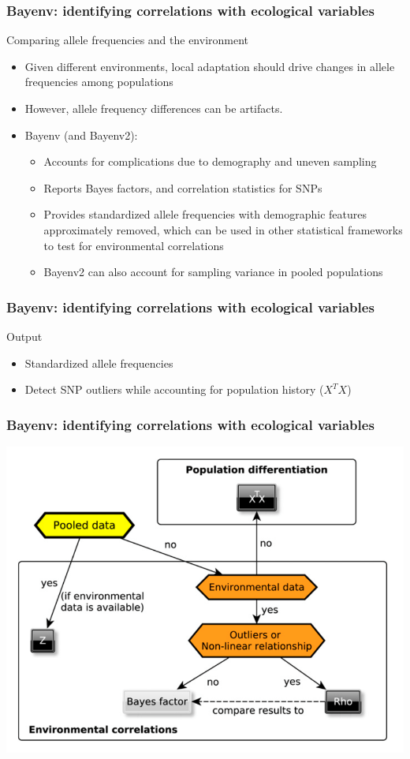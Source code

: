 \begin{frame}
\frametitle{Bayenv: identifying correlations with ecological
variables}
\begin{block}{Comparing allele frequencies and the environment}
\begin{itemize}
\item{Given different environments, local adaptation should drive changes in
allele frequencies among populations}
\item{However, allele frequency differences can be artifacts.}
\item{Bayenv (and Bayenv2):}
\begin{itemize}
\item{Accounts for complications due to demography and uneven sampling}
\item{Reports Bayes factors, and correlation statistics for SNPs}
\item{Provides standardized allele frequencies with demographic features
approximately removed, which can be used in other statistical frameworks
to test for environmental correlations}
\item{Bayenv2 can also account for sampling variance in pooled populations}
\end{itemize}
\end{itemize}
\end{block}
\tiny
\citet{Gunther:2013ik, COOP:2010ke}
\end{frame}


\begin{frame}
\frametitle{Bayenv: identifying correlations with ecological
variables}
\begin{block}{Output}
\begin{itemize}
\item{Standardized allele frequencies}
\item{Detect SNP outliers while accounting for population history ($X^TX$)}
\end{itemize}
\end{block}
\end{frame}

\begin{frame}
\frametitle{Bayenv: identifying correlations with ecological
variables}
\begin{block}{}
\centering
\includegraphics[width=.7\textwidth]{bayenv1}
\end{block}
\end{frame}

